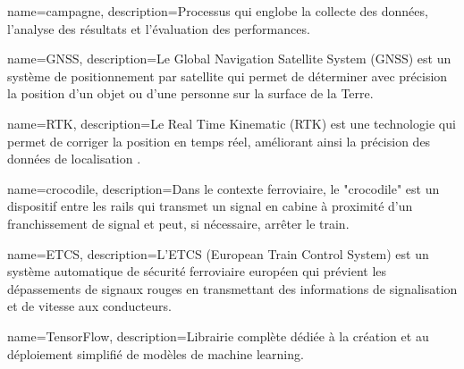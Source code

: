 {
    name=campagne,
    description={Processus qui englobe la collecte des données, l'analyse des résultats et l'évaluation des performances.}
} 


{
name=GNSS,
description={Le Global Navigation Satellite System (GNSS) est un système de positionnement par satellite qui permet de déterminer avec précision la position d'un objet ou d'une personne sur la surface de la Terre.}
}

{
    name=RTK,
    description={Le Real Time Kinematic (RTK) est une technologie qui permet de corriger la position en temps réel, améliorant ainsi la précision des données de localisation .}
}

{
    name=crocodile,
    description={Dans le contexte ferroviaire, le "crocodile" est un dispositif entre les rails qui transmet un signal en cabine à proximité d'un franchissement de signal et peut, si nécessaire, arrêter le train.}
}

{
    name=ETCS,
    description={L'ETCS (European Train Control System) est un système automatique de sécurité ferroviaire européen qui prévient les dépassements de signaux rouges en transmettant des informations de signalisation et de vitesse aux conducteurs.}
}

{
    name=TensorFlow,
    description={Librairie complète dédiée à la création et au déploiement simplifié de modèles de machine learning.}
}

\makeglossaries
